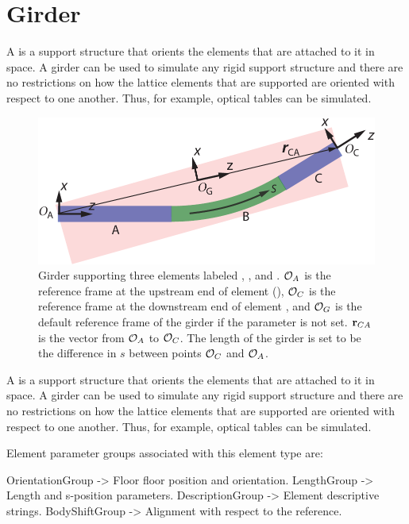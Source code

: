 \section{Girder}
\label{s:girder}

A  is a support structure that orients the elements that are attached to it in space. A
girder can be used to simulate any rigid support structure and there are no restrictions on how the
lattice elements that are supported are oriented with respect to one another.  Thus, for example,
optical tables can be simulated.

\begin{figure}[t]
  \centering
  \includegraphics{girder.pdf}
  \caption[Girder example.] {
Girder supporting three elements labeled , , and .  ${\cal O}_A$ is the reference
frame at the upstream end of element  (), ${\cal O}_C$ is the reference
frame at the downstream end of element , and ${\cal O}_G$ is the default  reference
frame of the girder if the  parameter is not set. ${\bf r}_{CA}$ is the vector from
${\cal O}_A$ to ${\cal O}_C$. The length  of the girder is set to be the difference in $s$ between
points ${\cal O}_C$ and ${\cal O}_A$.
  }
  \label{f:girder}
\end{figure}

A  is a support structure that orients the elements that are attached to it in space. A
girder can be used to simulate any rigid support structure and there are no restrictions on how the
lattice elements that are supported are oriented with respect to one another.  Thus, for example,
optical tables can be simulated.

Element parameter groups associated with this element type are:
\TOPrule
\begin{example}
  OrientationGroup -> Floor floor position and orientation.  
  LengthGroup        -> Length and s-position parameters.  
  DescriptionGroup   -> Element descriptive strings.  
  BodyShiftGroup     -> Alignment with respect to the reference. 
\end{example}
\BOTTOMrule

